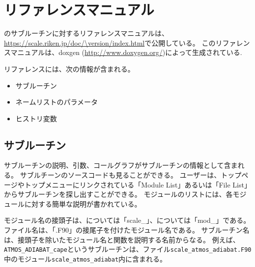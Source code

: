 \section{リファレンスマニュアル} \label{sec:reference_manual}
\scalelib のサブルーチンに対するリファレンスマニュアルは、\url{https://scale.riken.jp/doc/\version/index.html}で公開している。
このリファレンスマニュアルは、doxgen (\url{http://www.doxygen.org/})によって生成されている.

リファレンスには、次の情報が含まれる。
\begin{itemize}
\item サブルーチン
\item ネームリストのパラメータ
\item ヒストリ変数
\end{itemize}


\subsection{サブルーチン}
サブルーチンの説明、引数、コールグラフがサブルーチンの情報として含まれる。
サブルチーンのソースコードも見ることができる。
ユーザーは、トップページやトップメニューにリンクされている「Module List」あるいは「File List」からサブルーチンを探し出すことができる。
モジュールのリストには、各モジュールに対する簡単な説明が書かれている。

モジュール名の接頭子は、\scalelib については「scale\_」、\scalerm については「mod\_」である。
ファイル名は、「.F90」の接尾子を付けたモジュール名である。
サブルーチン名は、接頭子を除いたモジュール名と関数を説明する名前からなる。
例えば、\verb|ATMOS_ADIABAT_cape|というサブルーチンは、ファイル\verb|scale_atmos_adiabat.F90|中のモジュール\verb|scale_atmos_adiabat|内に含まれる。



